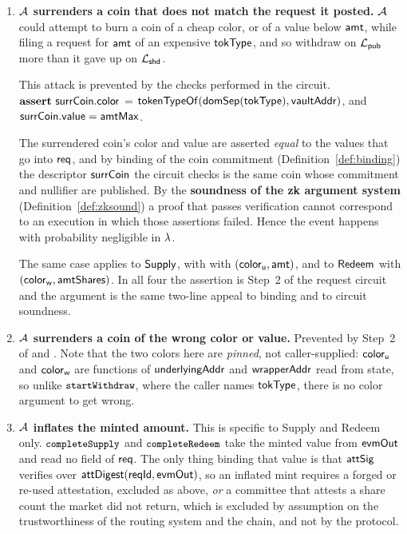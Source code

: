 \begin{enumerate}[leftmargin=1.8em,itemsep=5pt]
    \item \textbf{$\mathcal{A}$ surrenders a coin that does not match the request it posted.} $\mathcal{A}$
could attempt to burn a coin of a cheap color, or of a value below $\mathsf{amt}$, while filing a request
for $\mathsf{amt}$ of an expensive $\mathsf{tokType}$, and so withdraw on $\mathcal{L}_{\mathsf{pub}}$ more than it gave up on
$\mathcal{L}_{\mathsf{shd}}$.

This attack is prevented by the checks performed in the circuit.
$\textbf{assert}~ \mathsf{surrCoin}.\mathsf{color}$ = ${\mathsf{tokenTypeOf}}(\mathsf{domSep}(\mathsf{tokType}), \mathsf{vaultAddr})$,   and $\mathsf{surrCoin}.\mathsf{value} = \mathsf{amtMax}$.

The surrendered coin's color and value are asserted \emph{equal}
to the values that go into $\mathsf{req}$, and by binding of the coin commitment
(Definition~\ref{def:binding}) the descriptor $\mathsf{surrCoin}$ the circuit checks is the same coin whose
commitment and nullifier are published. By the \textbf{soundness of the  zk argument system}
(Definition~\ref{def:zksound}) a proof that passes verification cannot correspond to an execution in
which those assertions failed. Hence the event happens with probability negligible in $\lambda$.

\noindent The same  case applies to $\mathsf{Supply}$, with
with $(\mathsf{color}_{\mathsf{u}}, \mathsf{amt})$, and to $\mathsf{Redeem}$ with $(\mathsf{color}_{\mathsf{w}}, \mathsf{amtShares})$. In all four the assertion is Step~2 of the request circuit and the argument
is the same two-line appeal to binding and to circuit soundness.


\item \textbf{$\mathcal{A}$ surrenders a coin of the wrong color or value.} Prevented by  Step~2 of
       and . Note that the
      two colors here are \emph{pinned}, not caller-supplied: $\mathsf{color}_{\mathsf{u}}$ and $\mathsf{color}_{\mathsf{w}}$ are functions
      of $\mathsf{underlyingAddr}$ and $\mathsf{wrapperAddr}$ read from state, so unlike $\texttt{\small startWithdraw}$, where the caller
      names $\mathsf{tokType}$, there is no color argument to get wrong.


\item \textbf{$\mathcal{A}$ inflates the minted amount.} This is specific to Supply and Redeem only.
      $\texttt{\small completeSupply}$ and $\texttt{\small completeRedeem}$ take the minted value from $\mathsf{evmOut}$ and read no
      field of $\mathsf{req}$. The only thing binding that value is that
      $\mathsf{attSig}$ verifies over $\mathsf{attDigest}(\mathsf{reqId}, \mathsf{evmOut})$, so an inflated mint requires a forged or
      re-used attestation, excluded as above, \emph{or} a committee that attests a share count
      the market did not return, which is excluded by assumption on the trustworthiness of the routing system and the chain,  and not by the protocol.
\end{enumerate}
